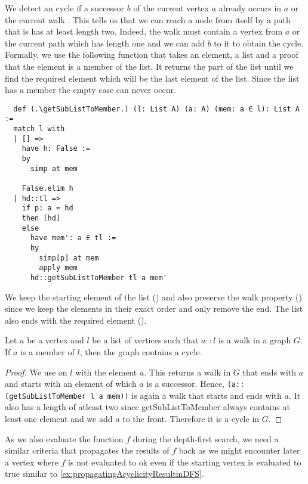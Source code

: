 We detect an cycle if a successor $b$ of the current vertex $a$ already occurs in $a$ or the current walk . This tells us that we can reach a node from itself by a path that is has at least length two. Indeed, the walk must contain a vertex from $a$ or the current path which has length one and we can add $b$ to it to obtain the cycle. Formally, we use the following function that takes an element, a list and a proof that the element is a member of the list. It returns the part of the list until we find the required element which will be the last element of the list. Since the list has a member the empty case can never occur.

\begin{lstlisting}
  def (.\getSubListToMember.) (l: List A) (a: A) (mem: a ∈ l): List A :=
  match l with
  | [] =>
    have h: False :=
    by
      simp at mem

    False.elim h
  | hd::tl =>
    if p: a = hd
    then [hd]
    else
      have mem': a ∈ tl :=
      by
        simp[p] at mem
        apply mem
      hd::getSubListToMember tl a mem'
\end{lstlisting}

We keep the starting element of the list (\getSubListToMemberPreservesFront) and also preserve the walk property (\getSubListToMemberPreservesWalk) since we keep the elements in their exact order and only remove the end. The list also ends with the required element (\getSubListToMemberEndsWithElement). 

\begin{lemma}[\frontRepetitionInWalkImpliesCycle]
  Let $a$ be a vertex and $l$ be a list of vertices such that $a::l$ is a walk in a graph $G$. If $a$ is a member of $l$, then the graph contains a cycle.
\end{lemma}
\begin{proof}
  We use \getSubListToMember on $l$ with the element $a$. This returns a walk in $G$ that ends with $a$ and starts with an element of which $a$ is a successor. Hence, \lstinline|(a::(getSubListToMember l a mem))| is again a walk that starts and ends with $a$. It also has a length of atleast two since getSubListToMember always contains at least one element and we add $a$ to the front. Therefore it is a cycle in $G$.
\end{proof}

As we also evaluate the function $f$ during the depth-first search, we need a similar criteria that propagates the results of $f$ back as we might encounter later a vertex where $f$ is not evaluated to ok even if the starting vertex is evaluated to true similar to \cref{ex:propagatingAcyclicityResultinDFS}.

